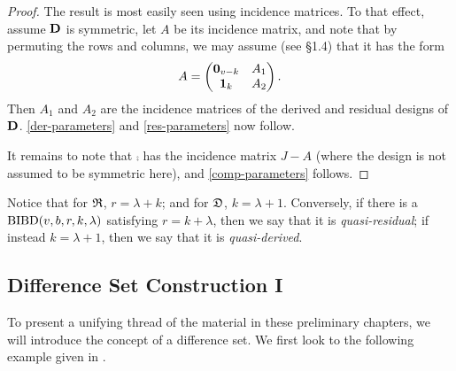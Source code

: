 \documentclass[../../../main]{subfiles}
\begin{document}
\begin{proof}
 The result is most easily seen using incidence matrices. To that effect, assume $\mathbf{D}$ is symmetric, let $A$ be its incidence matrix, and note that by permuting the rows and columns, we may assume (see \S1.4) that it has the form
 \[
 A = \begin{pmatrix}
      \mathbf{0}_{v-k} & A_1 \\
      \mathbf{1}_k & A_2
     \end{pmatrix}.
 \]
 Then $A_1$ and $A_2$ are the incidence matrices of the derived and residual designs of $\mathbf{D}$. \ref{der-parameters} and \ref{res-parameters} now follow.
 
 It remains to note that $\comp$ has the incidence matrix $J - A$ (where the design is not assumed to be symmetric here), and \ref{comp-parameters} follows.
\end{proof}

Notice that for $\mathfrak{R}$, $r = \lambda + k$; and for $\mathfrak{D}$, $k = \lambda + 1$. Conversely, if there is a $\text{BIBD}(v,b,r,k,\lambda)$ satisfying $r = k + \lambda$, then we say that it is {\it quasi-residual}; if instead $k = \lambda + 1$, then we say that it is {\it quasi-derived}.

\dinkus

\subsection{Difference Set Construction I}

To present a unifying thread of the material in these preliminary chapters, we will introduce the concept of a difference set. We first look to the following example given in \cite{combinatorial-theory}.
\end{document}
